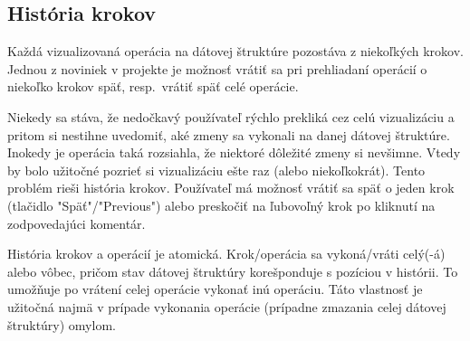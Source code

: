 \subsection{História krokov}
Každá vizualizovaná operácia na dátovej štruktúre pozostáva
z niekoľkých krokov. Jednou z noviniek v projekte je možnosť vrátiť sa pri
prehliadaní operácií o niekoľko krokov späť, resp.\ vrátiť späť
celé operácie.

Niekedy sa stáva, že nedočkavý používateľ rýchlo prekliká cez celú vizualizáciu
a pritom si nestihne uvedomiť, aké zmeny sa vykonali na danej dátovej
štruktúre. Inokedy je operácia taká rozsiahla, že niektoré dôležité zmeny si
nevšimne. Vtedy by bolo užitočné pozrieť si vizualizáciu ešte raz (alebo
niekoľkokrát). Tento problém rieši história krokov. Používateľ má možnosť vrátiť
sa späť o jeden krok (tlačidlo "Späť"/"Previous") alebo preskočiť na ľubovoľný
krok po kliknutí na zodpovedajúci komentár.

História krokov a operácií je atomická. Krok/operácia sa vykoná/vráti celý(-á)
alebo vôbec, pričom stav dátovej štruktúry korešponduje s pozíciou v histórii.
To umožňuje po vrátení celej operácie vykonať inú operáciu. Táto vlastnosť je
užitočná najmä v prípade vykonania operácie (prípadne zmazania celej dátovej
štruktúry) omylom.

